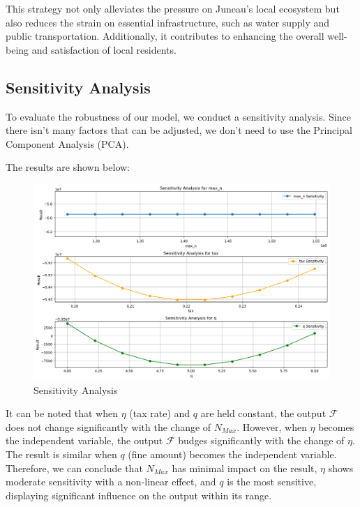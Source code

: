 This strategy not only alleviates the pressure on Juneau's local ecosystem but also reduces the strain on essential infrastructure, such as water supply and public transportation. Additionally, it contributes to enhancing the overall well-being and satisfaction of local residents.

\subsection{Sensitivity Analysis}

To evaluate the robustness of our model, we conduct a sensitivity analysis.
Since there isn't many factors that can be adjusted, we don't need to use the Principal Component Analysis (PCA).

The results are shown below:

\begin{figure}[H]
    \centering
    \includegraphics[width=1\textwidth]{Sensitivity_Analysis.png} %
    \vspace{-0.5cm}
    \caption{Sensitivity Analysis}
\end{figure}

It can be noted that when $\eta$ (tax rate) and $q$ are held constant, 
the output $\mathcal{F}$ does not change significantly with the change of $N_{Max}$.
However, when $\eta$ becomes the independent variable, the output $\mathcal{F}$
budges significantly with the change of $\eta$. The result is similar when $q$ (fine amount) becomes the independent variable.
Therefore, we can conclude that $N_{Max}$ has minimal impact on the result, 
$\eta$ shows moderate sensitivity with a non-linear effect, 
and $q$ is the most sensitive, displaying significant influence on 
the output within its range.